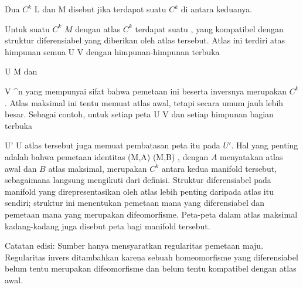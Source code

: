 {}
{

Dua
$C^k$
\mathkor {} {L} {dan} {M} {}
disebut
jika terdapat suatu
$C^k$ di antara keduanya.

}

{}
{

Untuk suatu
$C^k$ $M$ dengan atlas $C^k$
 terdapat suatu  {,} yang kompatibel dengan struktur diferensiabel yang diberikan oleh atlas tersebut. Atlas ini terdiri atas himpunan semua
\maabbdisp {\beta} { U } { V
} {}
dengan himpunan-himpunan terbuka

\mavergleichskette
{\vergleichskette
{ U
}
{ \subseteq }{ M
}
{  }{
}
{    }{
}
{   }{
}
}
{}{}{}
dan

\mavergleichskette
{\vergleichskette
{ V
}
{ \subseteq }{ \R^n
}
{  }{
}
{    }{
}
{   }{
}
}
{}{}{}
yang mempunyai sifat bahwa pemetaan ini beserta inversnya merupakan
$C^k$
 {} {.}
Atlas maksimal ini tentu memuat atlas awal, tetapi secara umum jauh lebih besar. Sebagai contoh, untuk setiap peta
\maabb {\beta} { U } { V
} {}
dan setiap himpunan bagian terbuka

\mavergleichskette
{\vergleichskette
{ U'
}
{ \subseteq }{ U
}
{  }{
}
{    }{
}
{   }{
}
}
{}{}{}
atlas tersebut juga memuat pembatasan peta itu pada $U'$. Hal yang penting adalah bahwa pemetaan identitas
 {(M,A)} {(M,B)
} {,}
dengan $A$ menyatakan atlas awal dan $B$ atlas maksimal, merupakan
$C^k$ antara kedua manifold tersebut, sebagaimana langsung mengikuti dari definisi. Struktur diferensiabel pada manifold yang direpresentasikan oleh atlas lebih penting daripada atlas itu sendiri; struktur ini menentukan pemetaan mana yang diferensiabel dan pemetaan mana yang merupakan difeomorfisme. Peta-peta dalam atlas maksimal kadang-kadang juga disebut peta
 {} {}
bagi manifold tersebut.

Catatan edisi: Sumber hanya mensyaratkan regularitas pemetaan maju. Regularitas invers ditambahkan karena sebuah homeomorfisme yang diferensiabel belum tentu merupakan difeomorfisme dan belum tentu kompatibel dengan atlas awal.

}

